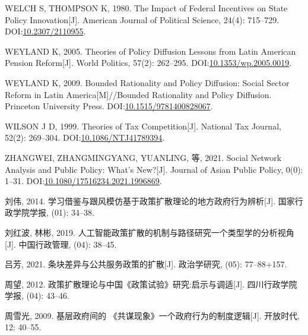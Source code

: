 \documentclass[
  12pt,
]{ctexart}
\newlength{\cslhangindent}
\newlength{\cslentryspacingunit} %
\newenvironment{CSLReferences}[2] %
 {%
  \setlength{\parindent}{0pt}
  \ifodd #1
  \let\oldpar\par
  \def\par{\hangindent=\cslhangindent\oldpar}
  \fi
  \setlength{\parskip}{#2\cslentryspacingunit}
 }%
 {}
\begin{document}
\begin{CSLReferences}{1}{0}
\leavevmode{}%
WELCH S, THOMPSON K, 1980. The {Impact} of {Federal Incentives} on {State Policy Innovation}{[}J{]}. American Journal of Political Science, 24(4): 715--729. DOI:\href{https://doi.org/10.2307/2110955}{10.2307/2110955}.

\leavevmode{}%
WEYLAND K, 2005. Theories of {Policy Diffusion Lessons} from {Latin American Pension Reform}{[}J{]}. World Politics, 57(2): 262--295. DOI:\href{https://doi.org/10.1353/wp.2005.0019}{10.1353/wp.2005.0019}.

\leavevmode{}%
WEYLAND K, 2009. Bounded {Rationality} and {Policy Diffusion}: {Social Sector Reform} in {Latin America}{[}M{]}//Bounded Rationality and Policy Diffusion. {Princeton University Press}. DOI:\href{https://doi.org/10.1515/9781400828067}{10.1515/9781400828067}.

\leavevmode{}%
WILSON J D, 1999. Theories of {Tax Competition}{[}J{]}. National Tax Journal, 52(2): 269--304. DOI:\href{https://doi.org/10.1086/NTJ41789394}{10.1086/NTJ41789394}.

\leavevmode{}%
ZHANGWEI, ZHANGMINGYANG, YUANLING, 等, 2021. Social Network Analysis and Public Policy: What's New?{[}J{]}. Journal of Asian Public Policy, 0(0): 1--31. DOI:\href{https://doi.org/10.1080/17516234.2021.1996869}{10.1080/17516234.2021.1996869}.

\leavevmode{}%
刘伟, 2014. {学习借鉴与跟风模仿\textemdash\textemdash 基于政策扩散理论的地方政府行为辨析}{[}J{]}. 国家行政学院学报, (01): 34--38.

\leavevmode{}%
刘红波, 林彬, 2019. {人工智能政策扩散的机制与路径研究\textemdash\textemdash 一个类型学的分析视角}{[}J{]}. 中国行政管理, (04): 38--45.

\leavevmode{}%
吕芳, 2021. {条块差异与公共服务政策的扩散}{[}J{]}. 政治学研究, (05): 77--88+157.

\leavevmode{}%
周望, 2012. {政策扩散理论与中国{《政策试验》}研究:启示与调适}{[}J{]}. 四川行政学院学报, (04): 43--46.

\leavevmode{}%
周雪光, 2009. 基层政府间的 {《共谋现象》}\textemdash\textemdash 一个政府行为的制度逻辑{[}J{]}. 开放时代, 12: 40--55.


\end{CSLReferences}
\end{document}
